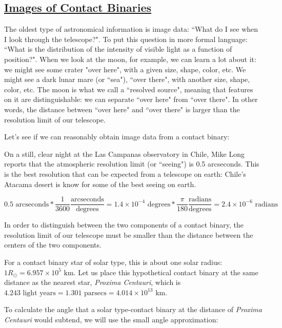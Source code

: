 \documentclass[12pt]{article} %
\numberwithin{equation}{section} %
\begin{document}
\subsection[Images of Contact Binaries]{\hyperlink{toc}{Images of Contact Binaries}} \label{sec: Images of Contact Binaries}

The oldest type of astronomical information is image data: ``What do I see when I look through the telescope?". To put this question in more formal language: ``What is the distribution of the intensity of visible light as a function of position?". When we look at the moon, for example, we can learn a lot about it: we might see some crater "over here", with a given size, shape, color, etc. We might see a dark lunar mare (or ``sea"), ``over there", with another size, shape, color, etc. The moon is what we call a ``resolved source", meaning that features on it are distinguishable: we can separate ``over here" from ``over there". In other words, the distance between ``over here" and ``over there" is larger than the resolution limit of our telescope.

Let's see if we can reasonably obtain image data from a contact binary:

On a still, clear night at the Las Campanas observatory in Chile, Mike Long reports that the atmospheric resolution limit (or ``seeing") is 0.5 arcseconds. This is the best resolution that can be expected from a telescope on earth: Chile's Atacama desert is know for some of the best seeing on earth.

\begin{equation} \label{eqn: arcseconds}
0.5 \text{ arcseconds} * \frac{1}{3600} \frac{\text{arcseconds}}{\text{degrees}} = 1.4 \times 10^{-4} \text{ degrees} * \frac{\pi}{180} \frac{\text{radians}}{\text{degrees}} = 2.4 \times 10^{-6} \text{ radians}
\end{equation}

In order to distinguish between the two components of a contact binary, the resolution limit of our telescope must be smaller than the distance between the centers of the two components. 

For a contact binary star of solar type, this is about one solar radius: $1 R_{\odot} = 6.957 \times 10^{5} \text{ km}$. Let us place this hypothetical contact binary at the same distance as the nearest star, \emph{Proxima Centauri}, which is $4.243 \text{ light years} = 1.301 \text{ parsecs} = 4.014 \times 10^{13} \text{ km}$.

To calculate the angle that a solar type-contact binary at the distance of \emph{Proxima Centauri} would subtend, we will use the small angle approximation:
\end{document}
